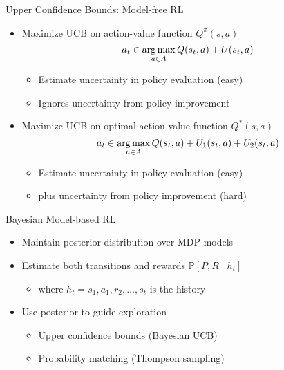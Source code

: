 \begin{frame}[c]{Upper Confidence Bounds: Model-free RL}
	
	\begin{itemize}
		\item Maximize UCB on action-value function $Q^\pi(s,a)$
		$$a_t \in \operatorname*{arg\,max}_{a \in A} Q(s_t, a) + U(s_t, a) $$
		
		\begin{itemize}
			\item Estimate uncertainty in policy evaluation (easy)
			\item Ignores uncertainty from policy improvement
		\end{itemize}
		\item Maximize UCB on optimal action-value function $Q^*(s,a)$
		$$a_t \in \operatorname*{arg\,max}_{a \in A} Q(s_t, a) + U_1(s_t, a) + U_2(s_t, a)$$
		\begin{itemize}
			\item Estimate uncertainty in policy evaluation (easy)
			\item plus uncertainty from policy improvement (hard)
		\end{itemize}
		
	\end{itemize}
	
\end{frame}
\begin{frame}[c]{Bayesian Model-based RL}
	
	\begin{itemize}
		\item Maintain posterior distribution over MDP models
		\item Estimate both transitions and rewards $ \mathbb{P}[P, R \mid h_t]$
		\begin{itemize}
			\item where $h_t = s_1, a_1, r_2, \ldots, s_t$ is the history
		\end{itemize}
		\item Use posterior to guide exploration
		\begin{itemize}
			\item Upper confidence bounds (Bayesian UCB)
			\item Probability matching (Thompson sampling)
		\end{itemize}
		
	\end{itemize}
	
\end{frame}
